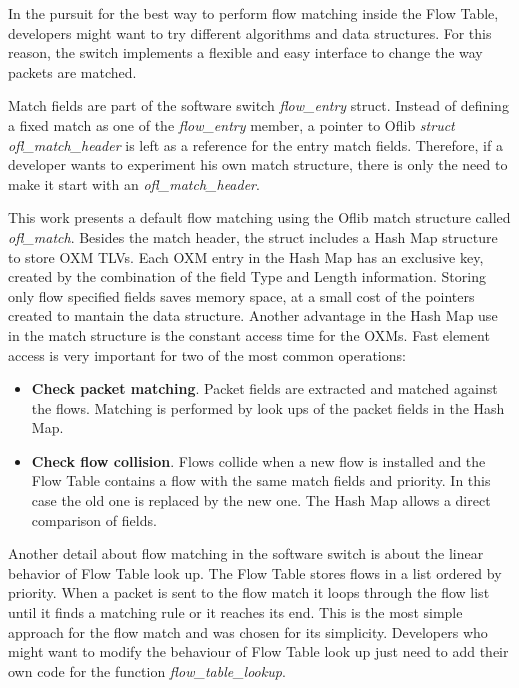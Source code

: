     In the pursuit for the best way to perform flow matching inside the Flow Table, developers might want to try different algorithms and data structures. For this reason, the switch implements a flexible and easy interface to change the way packets are matched. 
    
    Match fields are part of the software switch \textit{flow_entry} struct. Instead of defining a fixed match as one of the \textit{flow_entry} member, a pointer to Oflib \textit{struct ofl_match_header} is left as a reference for the entry match fields. Therefore, if a developer wants to experiment his own match structure, there is only the need to make it start with an \textit{ ofl_match_header}.    

    This work presents a default flow matching using the Oflib match structure called \textit{ofl_match}. Besides the match header, the struct includes a Hash Map structure to store OXM TLVs. Each OXM entry in the Hash Map has an  exclusive key, created by the combination of the field Type and Length information. Storing only flow specified fields saves memory space, at a small cost of the pointers created to mantain the data structure. Another advantage in the Hash Map use in the match structure is the constant access time for the OXMs. Fast element access is very important for two of the most common operations:
    
    \begin{itemize}
    \item \textbf{Check packet matching}. Packet fields are extracted and matched against the flows. Matching is performed by look ups of the packet fields in the Hash Map.        
    
    \item \textbf{Check flow collision}. Flows collide when a new flow is installed and the Flow Table contains a flow with the same match fields and priority. In this case the old one is replaced by the new one. The Hash Map allows a direct comparison of fields.
    \end{itemize}

    Another detail about flow matching in the software switch is about the linear behavior of Flow Table look up. The Flow Table stores flows in a list ordered by priority. When a packet is sent to the flow match it loops through the flow list until it finds a matching rule or it reaches its end. This is the most simple approach for the flow match and was chosen for its simplicity. Developers who might want to modify the behaviour of Flow Table look up just need to add their own code for the function \textit{flow_table_lookup}.
         
